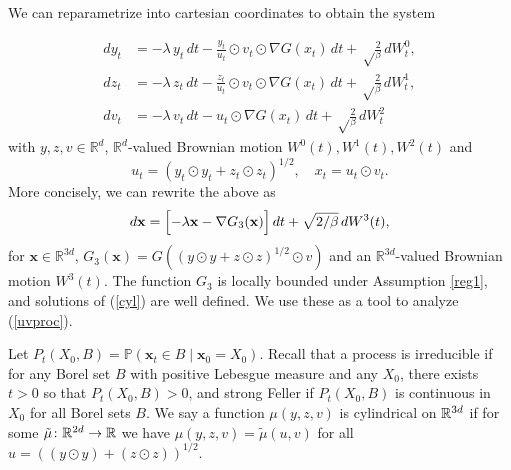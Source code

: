 \documentclass[11pt, twoside]{report}
\renewcommand{\vec}[1]{{\mathbf{#1}}}
\begin{document}
We can reparametrize into cartesian coordinates to obtain the system

\begin{equation} 
\begin{split} 
dy_t&=-\lambda\,   y_t\,dt - \frac{y_t}{u_t} \odot v_t\odot \nabla G(x_t)\,dt
 +\sqrt\frac{2}{\beta}\,dW^0_t,\\
dz_t&=-\lambda\,   z_t\,dt - \frac{z_t}{u_t} \odot v_t\odot \nabla G(x_t)\,dt
 +\sqrt\frac{2}{\beta}\,dW^1_t,\\
dv_t&=-\lambda\,   v_t\,dt - u_t\odot \nabla G(x_t)\,dt
 +\sqrt\frac{2}{\beta}\,dW^2_t
\label{yzvproc}
\end{split}
\end{equation}
with $y,z,v \in \mathbb{R}^d$, $\mathbb{R}^{d}$-valued Brownian motion $W^0(t), W^1(t), W^2(t)$ and
\[u_t = (y_t \odot y_t + z_t \odot z_t)^{1/2}, \quad x_t = u_t \odot v_t.\]
More concisely, we can rewrite the above as 
\begin{equation}  
 \begin{aligned}
 d\vec x= \Bigl[-\lambda \vec x - \nabla G_{3}(\vec x)\Bigr]\,dt +\sqrt{2/\beta}\, dW^3(t),
  \end{aligned}\label{cyl}
\end{equation}
for $\vec x \in \mathbb{R}^{3d}$, $G_{3}(\vec x)= G( (y\odot y + z\odot z)^{1/2} \odot v)$ and an $\mathbb{R}^{3d}$-valued Brownian motion $W^3(t)$. The function $G_{3}$ is locally bounded under Assumption \ref{reg1}, and solutions of (\ref{cyl}) are well defined. We use these as a tool to analyze (\ref{uvproc}).

Let $P_t(X_0,B)=\mathbb{P}(\vec x_t\in B\mid \vec x_0=X_0)$.
Recall that a process is irreducible if for any Borel set $B$ with positive Lebesgue measure and any $X_0$, there exists $t>0$ so that $P_t(X_0,B)>0$, and strong Feller if $P_t(X_0,B)
$ is continuous in $X_0$ for all Borel sets $B$.
We say a function $\mu(y,z,v)$ is cylindrical on $\mathbb{R}^{3d}$ if for some $\tilde \mu\colon \mathbb{R}^{2d}\to \mathbb{R}$ we have $\mu(y,z,v)=\tilde \mu(u,v)$  for all $u=((y\odot y)+(z\odot z))^{1/2}$.
\end{document}
